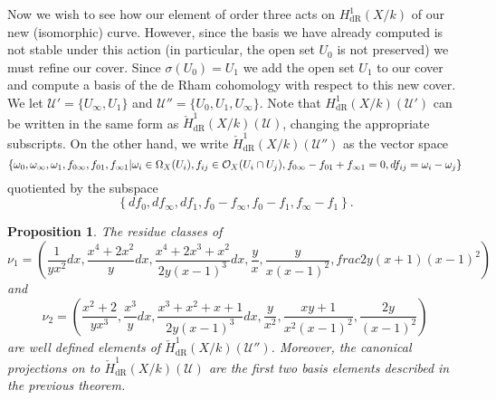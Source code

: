 \documentclass[draft, 11pt]{article} %
\theoremstyle{plain}
\newtheorem{prop}[defn]{Proposition}
\theoremstyle{remark}
\newcommand{\cO}{{\cal O}}
\newcommand{\cU}{{\mathcal U}}
\newcommand{\derhamhone}{H_{\text {dR}}^1(X/k)}
\newcommand{\cechderhamhone}{\check{H}_{\text {dR}}^1(X/k)}
\begin{document}
Now we wish to see how our element of order three acts on $\derhamhone$ of our new (isomorphic) curve.
However, since the basis we have already computed is not stable under this action (in particular, the open set $U_0$ is not preserved) we must refine our cover.
Since $\sigma(U_0) = U_1$ we add the open set $U_1$ to our cover and compute a basis of the de Rham cohomology with respect to this new cover.
We let $\cU' = \{ U_\infty, U_1\}$ and $\cU'' = \{U_0, U_1, U_\infty\}$.
Note that $\derhamhone(\cU')$ can be written in the same form as $\cechderhamhone(\cU)$, changing the appropriate subscripts.
On the other hand, we write $\cechderhamhone(\cU'')$ as the vector space
\[
\left\{ \omega_0, \omega_\infty , \omega_1, f_{0\infty}, f_{01},f_{\infty 1} | \omega_i \in \Omega_X(U_i), f_{ij} \in \cO_X(U_i \cap U_j), f_{0\infty} - f_{01} + f_{\infty1} = 0, df_{ij} = \omega_i - \omega_j \right\}
\]
quotiented by the subspace 
\[
\left\{ df_0, df_\infty, df_1, f_0- f_\infty, f_0 - f_1, f_\infty - f_1 \right\}.
\]
\begin{prop}
The residue classes of
\[
\nu_1 = \left(\frac{1}{yx^2}dx, \frac{x^4 + 2x^2}{y}dx, \frac{x^4 + 2x^3 +  x^2}{2y(x-1)^3}dx, \frac{y}{x}, \frac{y}{x(x-1)^2}, frac{2y(x+1)}{(x-1)^2} \right)
\]
and
\[
\nu_2 = \left( \frac{x^2 + 2}{yx^3}, \frac{x^3}{y}dx, \frac{x^3 + x^2 + x+ 1}{2y(x-1)^3}dx, \frac{y}{x^2}, \frac{xy +1}{x^2(x-1)^2}, \frac{2y}{(x-1)^2} \right)
\]
are well defined elements of $\cechderhamhone(\cU'')$.
Moreover, the canonical projections on to $\cechderhamhone(\cU)$ are the first two basis elements described in the previous theorem.
\end{prop}
\end{document}
